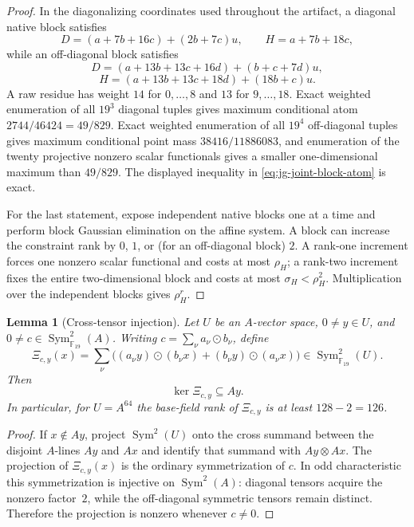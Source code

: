 \documentclass[11pt]{article}
\newtheorem{lemma}[theorem]{Lemma}
\newcommand{\F}{\mathbb F}
\begin{document}
\begin{proof}
In the diagonalizing coordinates used throughout the artifact, a diagonal
native block satisfies
\[
 D=(a+7b+16c)+(2b+7c)u,\qquad H=a+7b+18c,
\]
while an off-diagonal block satisfies
\[
 D=(a+13b+13c+16d)+(b+c+7d)u,
\]
\[
 H=(a+13b+13c+18d)+(18b+c)u.
\]
A raw residue has weight $14$ for $0,\ldots,8$ and $13$ for
$9,\ldots,18$.  Exact weighted enumeration of all $19^3$ diagonal tuples
gives maximum conditional atom
$2744/46424=49/829$.  Exact weighted enumeration of all $19^4$
off-diagonal tuples gives maximum conditional point mass
$38416/11886083$, and enumeration of the twenty projective nonzero scalar
functionals gives a smaller one-dimensional maximum than $49/829$.
The displayed inequality in \eqref{eq:jg-joint-block-atom} is exact.

For the last statement, expose independent native blocks one at a time and
perform block Gaussian elimination on the affine system.  A block can
increase the constraint rank by $0$, $1$, or (for an off-diagonal block) $2$.
A rank-one increment forces one nonzero scalar functional and costs at most
$\rho_H$; a rank-two increment fixes the entire two-dimensional block and
costs at most $\sigma_H<\rho_H^2$.  Multiplication over the independent blocks
gives $\rho_H^r$.
\end{proof}

\begin{lemma}[Cross-tensor injection]
\label{lem:jg-cross-tensor}
Let $U$ be an $A$-vector space, $0\ne y\in U$, and
$0\ne c\in\operatorname{Sym}^2_{\F_{19}}(A)$.  Writing
$c=\sum_\nu a_\nu\mathbin\odot b_\nu$, define
\[
 \Xi_{c,y}(x)=\sum_\nu\bigl((a_\nu y)\mathbin\odot(b_\nu x)
 +(b_\nu y)\mathbin\odot(a_\nu x)\bigr)
 \in\operatorname{Sym}^2_{\F_{19}}(U).
\]
Then
\begin{equation}
  \ker\Xi_{c,y}\subseteq Ay.
  \label{eq:jg-cross-tensor-kernel}
\end{equation}
In particular, for $U=A^{64}$ the base-field rank of $\Xi_{c,y}$ is at least
$128-2=126$.
\end{lemma}

\begin{proof}
If $x\notin Ay$, project $\operatorname{Sym}^2(U)$ onto the cross summand
between the disjoint $A$-lines $Ay$ and $Ax$ and identify that summand with
$Ay\otimes Ax$.  The projection of $\Xi_{c,y}(x)$ is the ordinary
symmetrization of $c$.  In odd characteristic this symmetrization is
injective on $\operatorname{Sym}^2(A)$: diagonal tensors acquire the nonzero
factor~$2$, while the off-diagonal symmetric tensors remain distinct.
Therefore the projection is nonzero whenever $c\ne0$.
\end{proof}
\end{document}
